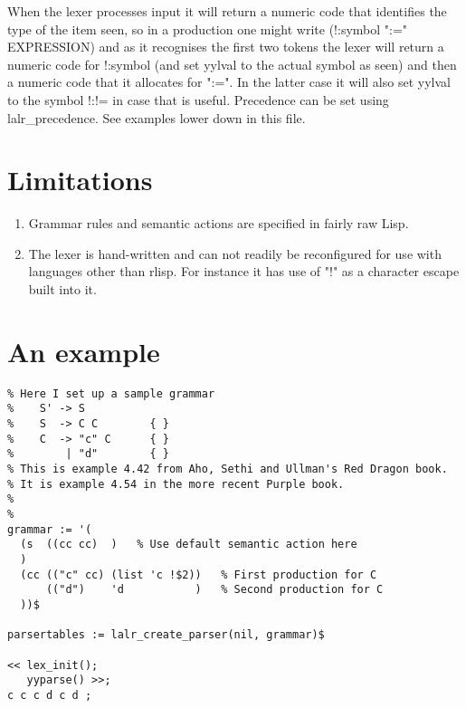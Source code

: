 \documentclass[12pt]{article}
\begin{document}
When the lexer processes input it will return a numeric code that identifies
the type of the item seen, so in a production one might write
    (!:symbol ":=" EXPRESSION)
and as it recognises the first two tokens the lexer will return a numeric
code for !:symbol (and set yylval to the actual symbol as seen) and then
a numeric code that it allocates for ":=". In the latter case it will
also set yylval to the symbol !:!= in case that is useful.
%
Precedence can be set using {\ttfamily lalr\_precedence}. See examples lower down in this
file.


\section{Limitations}
\begin{enumerate}
\item Grammar rules and semantic actions are specified in fairly raw Lisp.
\item The lexer is hand-written and can not readily be reconfigured for
    use with languages other than rlisp. For instance it has use of "!"
    as a character escape built into it.
\end{enumerate}


\section{An example}
\begin{verbatim}
% Here I set up a sample grammar
%    S' -> S
%    S  -> C C        { }
%    C  -> "c" C      { }
%        | "d"        { }
% This is example 4.42 from Aho, Sethi and Ullman's Red Dragon book.
% It is example 4.54 in the more recent Purple book.
%
%
grammar := '(
  (s  ((cc cc)  )   % Use default semantic action here
  )
  (cc (("c" cc) (list 'c !$2))   % First production for C
      (("d")    'd           )   % Second production for C
  ))$

parsertables := lalr_create_parser(nil, grammar)$

<< lex_init();
   yyparse() >>;
c c c d c d ;
\end{verbatim}
\end{document}
